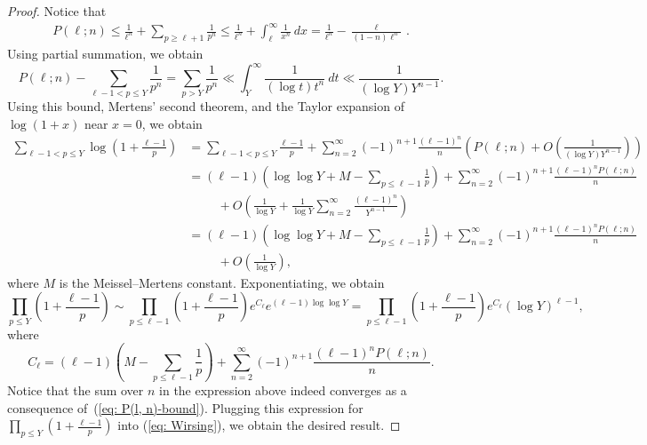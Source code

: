 \documentclass[12pt]{amsart}
\begin{document}
\begin{proof}
Notice that 
\begin{align}
     P(\ell; n) %
    \leq \frac{1}{\ell^n} + \sum_{p \geq \ell+1} \frac{1}{p^n} %
    \leq \frac{1}{\ell^n} + \int_{\ell}^\infty \frac{1}{x^n} \ dx %
    = \frac{1}{\ell^n} - \frac{\ell}{(1-n)\ell^n} \label{eq: P(l, n)-bound}
    \,.
\end{align}
Using partial summation, we obtain
\begin{equation*} P(\ell; n) - \sum_{\ell -1 < p \leq Y} \frac{1}{p^n} = \sum_{p > Y} \frac{1}{p^n} \ll \int_{Y}^\infty \frac{1}{(\log t)t^n} \ dt \ll \frac{1}{(\log Y)Y^{n-1}}.\end{equation*} Using this bound, Mertens' second theorem, and the Taylor expansion of $\log(1+x)$ near $x=0$, we obtain
\begin{align*}
    \sum_{\ell-1 < p \leq Y} \log\left(1 + \frac{\ell-1}{p}\right) &= \sum_{\ell-1 < p \leq Y} \frac{\ell-1}{p} + \sum_{n=2}^\infty (-1)^{n+1} \frac{(\ell-1)^n}{n} \left(P(\ell;n) + O\left( \frac{1}{(\log Y)Y^{n-1}} \right) \right) \\
    &= (\ell-1)\left(\log \log Y +M - \sum_{p\leq \ell-1} \frac{1}{p} \right) + \sum_{n=2}^\infty (-1)^{n+1}\frac{(\ell-1)^n P(\ell;n)}{n} \\
    &\hspace{1cm}+O\left( \frac{1}{\log Y} + \frac{1}{\log Y}\sum_{n=2}^\infty \frac{(\ell-1)^n}{Y^{n-1}} \right) \\
    &= (\ell-1)\left(\log \log Y +M - \sum_{p\leq \ell-1} \frac{1}{p} \right) + \sum_{n=2}^\infty (-1)^{n+1}\frac{(\ell-1)^n P(\ell;n)}{n} \\ &\hspace{1cm}+ O\left( \frac{1}{\log Y}\right),
\end{align*}
where $M$ is the Meissel--Mertens constant. Exponentiating, we obtain
        \[ \prod_{p \leq Y} \left( 1 + \frac{\ell-1}{p}\right) \sim \prod_{p \leq \ell-1} \left( 1 + \frac{\ell-1}{p} \right)e^{C_{\ell}} e^{(\ell-1)\log \log Y} = \prod_{p \leq \ell-1} \left( 1 + \frac{\ell-1}{p} \right)e^{C_{\ell}} (\log Y)^{\ell-1}, \] where 
        \[ C_{\ell} =(\ell-1)\left(M - \sum_{p\leq \ell-1} \frac{1}{p}\right) +\sum_{n=2}^\infty (-1)^{n+1}\frac{(\ell-1)^n P(\ell;n)}{n}. \]
Notice that the sum over $n$ in the expression above indeed converges as a consequence of~(\ref{eq: P(l, n)-bound}). Plugging this expression for $\prod_{p \leq Y} \left( 1 + \frac{\ell-1}{p} \right)$ into (\ref{eq: Wirsing}), we obtain the desired result.
\end{proof}
\end{document}
